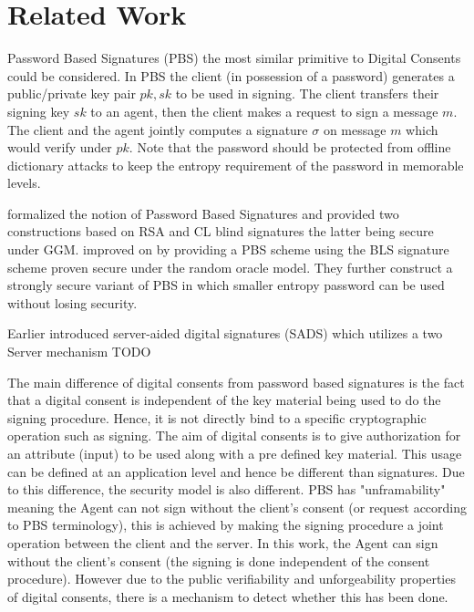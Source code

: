 \section{Related Work}

Password Based Signatures (PBS) the most similar primitive to Digital Consents could be considered. In PBS the client (in possession of a password) generates a public/private key pair $pk, sk$ to be used in signing.  The client transfers their signing key $sk$ to an agent, then the client makes a request to sign a message $m$. The client and the agent jointly computes a signature $\sigma$ on message $m$ which would verify under $pk$. Note that the password should be protected from offline dictionary attacks to keep the entropy requirement of the password in memorable levels.

\cite{GT12} formalized the notion of Password Based Signatures and provided two constructions based on RSA and CL blind signatures the latter being secure under GGM. \cite{JKR13} improved on \cite{GT12} by providing a PBS scheme using the BLS signature scheme proven secure under the random oracle model. They further construct a strongly secure variant of PBS in which smaller entropy password can be used without losing security.

Earlier \cite{HWF05} introduced server-aided digital signatures (SADS) which utilizes a two Server mechanism TODO

The main difference of digital consents from password based signatures is the fact that a digital consent is independent of the key material being used to do the signing procedure. Hence, it is not directly bind to a specific cryptographic operation such as signing. The aim of digital consents is to give authorization for an attribute (input) to be used along with a pre defined key material. This usage can be defined at an application level and hence be different than signatures. Due to this difference, the security model is also different. PBS has "unframability" meaning the Agent can not sign without the client's consent (or request according to PBS terminology), this is achieved by making the signing procedure a joint operation between the client and the server. In this work, the Agent can sign without the client's consent (the signing is done independent of the consent procedure). However due to the public verifiability and unforgeability properties of digital consents, there is a mechanism to detect whether this has been done.

